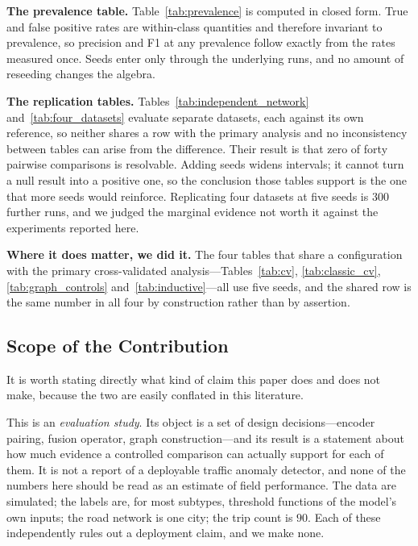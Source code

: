 \documentclass[journal]{IEEEtran}
\begin{document}
\textbf{The prevalence table.} Table~\ref{tab:prevalence} is computed in closed form. True and false positive rates are within-class quantities and therefore invariant to prevalence, so precision and F1 at any prevalence follow exactly from the rates measured once. Seeds enter only through the underlying runs, and no amount of reseeding changes the algebra.

\textbf{The replication tables.} Tables~\ref{tab:independent_network} and~\ref{tab:four_datasets} evaluate separate datasets, each against its own reference, so neither shares a row with the primary analysis and no inconsistency between tables can arise from the difference. Their result is that zero of forty pairwise comparisons is resolvable. Adding seeds widens intervals; it cannot turn a null result into a positive one, so the conclusion those tables support is the one that more seeds would reinforce. Replicating four datasets at five seeds is $300$ further runs, and we judged the marginal evidence not worth it against the experiments reported here.

\textbf{Where it does matter, we did it.} The four tables that share a configuration with the primary cross-validated analysis---Tables~\ref{tab:cv}, \ref{tab:classic_cv}, \ref{tab:graph_controls} and~\ref{tab:inductive}---all use five seeds, and the shared row is the same number in all four by construction rather than by assertion.

\subsection{Scope of the Contribution}
\label{sec:scope}
It is worth stating directly what kind of claim this paper does and does not make, because the two are easily conflated in this literature.

This is an \emph{evaluation study}. Its object is a set of design decisions---encoder pairing, fusion operator, graph construction---and its result is a statement about how much evidence a controlled comparison can actually support for each of them. It is not a report of a deployable traffic anomaly detector, and none of the numbers here should be read as an estimate of field performance. The data are simulated; the labels are, for most subtypes, threshold functions of the model's own inputs; the road network is one city; the trip count is $90$. Each of these independently rules out a deployment claim, and we make none.
\end{document}
